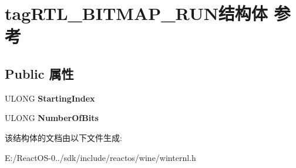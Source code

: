\hypertarget{structtag_r_t_l___b_i_t_m_a_p___r_u_n}{}\section{tag\+R\+T\+L\+\_\+\+B\+I\+T\+M\+A\+P\+\_\+\+R\+U\+N结构体 参考}
\label{structtag_r_t_l___b_i_t_m_a_p___r_u_n}
\subsection*{Public 属性}
\begin{DoxyCompactItemize}
\item 
\mbox{\label{structtag_r_t_l___b_i_t_m_a_p___r_u_n_ac0e741647273f1e47bd8b83235efeeb2}} 
U\+L\+O\+NG {\bfseries Starting\+Index}
\item 
\mbox{\label{structtag_r_t_l___b_i_t_m_a_p___r_u_n_abf26247ab09220caf889d9d8217a6075}} 
U\+L\+O\+NG {\bfseries Number\+Of\+Bits}
\end{DoxyCompactItemize}


该结构体的文档由以下文件生成\+:\begin{DoxyCompactItemize}
\item 
E\+:/\+React\+O\+S-\/0../sdk/include/reactos/wine/winternl.\+h\end{DoxyCompactItemize}
